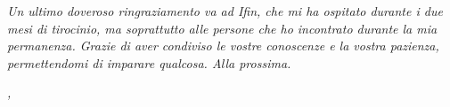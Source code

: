 \noindent \textit{Un ultimo doveroso ringraziamento va ad Ifin, che mi ha ospitato durante i due mesi di tirocinio, ma soprattutto alle persone che ho incontrato durante la mia permanenza. Grazie di aver condiviso le vostre conoscenze e la vostra pazienza, permettendomi di imparare qualcosa. Alla prossima.}\\
\bigskip

\noindent\textit{\myLocation, \myTime}
\hfill \myName

\endgroup

